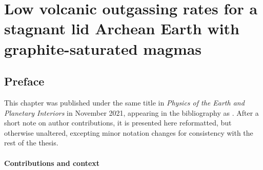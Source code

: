 
\chapter[Low volcanic outgassing rates for a stagnant lid Archean Earth]{Low volcanic outgassing rates for a stagnant lid Archean Earth with graphite-saturated magmas}
\label{chapter:outgassing}

\ifpdf
    \graphicspath{{Chapter2/Figs/Raster/}{Chapter2/Figs/PDF/}{Chapter2/Figs/}}
\else
    \graphicspath{{Chapter2/Figs/Vector/}{Chapter2/Figs/}}
\fi





\newcommand{\Ncases}{762}

\section*{Preface}

This chapter was published under the same title in \textit{Physics of the Earth and Planetary Interiors} in November 2021, appearing in the bibliography as \citet*{guimond_low_2021}. After a short note on author contributions, it is presented here reformatted, but otherwise unaltered, excepting minor notation changes for consistency with the rest of the thesis.


\subsubsection*{Contributions and context}

